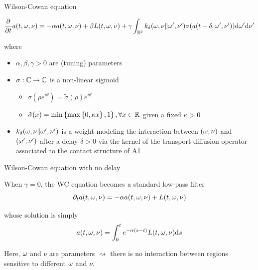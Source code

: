 \documentclass[10pt,american,ignorenonframetext,aspectratio=1610]{beamer}
\providecommand{\tightlist}{%
  \setlength{\itemsep}{0pt}\setlength{\parskip}{0pt}}
\theoremstyle{remark}
\begin{document}
\begin{frame}{Wilson-Cowan equation}
\protect\hypertarget{wilson-cowan-equation}{}

\[\frac{\partial}{\partial t} a(t,\omega,\nu) = -\alpha a(t,\omega,\nu) + \beta L(t,\omega,\nu)
+ \gamma\int_{\mathbb{R}^2} k_\delta(\omega,\nu\Vert\omega',\nu') \sigma(a(t-\delta,\omega',\nu')) \mathrm{d}\omega'\mathrm{d}\nu'\]

where

\begin{itemize}
\tightlist
\item
  \(\alpha,\beta,\gamma>0\) are (tuning) parameters
\item
  \(\sigma:\mathbb{C}\rightarrow\mathbb{C}\) is a non-linear sigmoid

  \begin{itemize}
  \tightlist
  \item
    \(\sigma(\rho e^{i\theta})=\tilde\sigma(\rho)e^{i\theta}\)
  \item
    \(\tilde\sigma(x)=\min\left\{\max\left\{0,\kappa x\right\}, 1\right\},\forall x\in\mathbb{R}\)
    given a fixed \(\kappa>0\)
  \end{itemize}
\item
  \(k_\delta(\omega,\nu\Vert\omega',\nu')\) is a weight modeling the interaction
  between \((\omega,\nu)\) and \((\omega',\nu')\) after a delay \(\delta>0\) via
  the kernel of the transport-diffusion operator associated to the
  contact structure of A1
\end{itemize}

\end{frame}

\begin{frame}{Wilson-Cowan equation with no delay}
\protect\hypertarget{wilson-cowan-equation-with-no-delay}{}

When \(\gamma=0\), the WC equation becomes a standard low-pass filter
\[\partial_t a(t,\omega,\nu)=-\alpha a(t,\omega,\nu) + L(t,\omega,\nu)\]

whose solution is simply
\[a(t,\omega,\nu) = \int_0^t e^{-\alpha(s-t)}L(t,\omega,\nu)\mathrm{d}s\]

Here, \(\omega\) and \(\nu\) are parameters \(\rightsquigarrow\) there is no
interaction between regions sensitive to different \(\omega\) and \(\nu\).

\end{frame}
\end{document}
